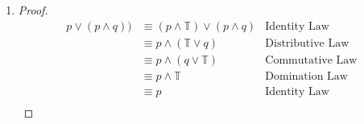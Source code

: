 \begin{Solution}{2.7}
\begin{enumerate}[label=(\alph*)]
\item
\begin{proof}
\begin{align*}
p\lor(p\land q))
&\equiv (p\land \mathbb{T}) \lor(p\land q)         &\text{Identity Law}\\
&\equiv p \land  (\mathbb{T} \lor q)   &\text{Distributive Law}\\
&\equiv p\land(q\lor \mathbb{T})                  &\text{Commutative Law}\\
&\equiv p \land \mathbb{T}   &\text{Domination Law}\\
&\equiv p                    &\text{Identity Law}\\
\end{align*}
\end{proof}
\end{enumerate}
\end{Solution}